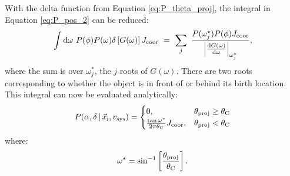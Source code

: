 \documentclass[usenatbib]{mnras}
\newcommand{\given}{\,|\,}
\newcommand{\dd}{\mathrm{d}}
\begin{document}
With the delta function from Equation \ref{eq:P_theta_proj}, the integral in Equation \ref{eq:P_pos_2} can be reduced:
\begin{equation}
\int \dd \omega\ P(\phi) P(\omega) \delta \left[ G(\omega) \right]  J_{\rm coor}\  =\ \sum_j\ \frac{P(\omega_j^{\star}) P(\phi)  J_{\rm coor}}{ \left| \frac{ \dd G (\omega) }{\dd \omega} \right|_{\omega_j^*}},
\end{equation}
where the sum is over $\omega_j^*$, the $j$ roots of $G(\omega)$. There are two roots corresponding to whether the object is in front of or behind its birth location. This integral can now be evaluated analytically:
\begin{equation}
P(\alpha, \delta \given \vec{x}_{\rm i}, v_{\rm sys} ) =
\begin{cases} 
      0, & \theta_{\rm proj} \geq \theta_{\rm C}\\
     \frac{\tan \omega^*}{2 \pi \theta_{\rm C}}  J_{\rm coor}, & \theta_{\rm proj} < \theta_{\rm C} 
   \end{cases}
\end{equation}
where:
\begin{equation}
\omega^{\star} = \sin^{-1} \left[ \frac{\theta_{\rm proj}}{\theta_{\rm C}} \right].
\end{equation}
\end{document}
